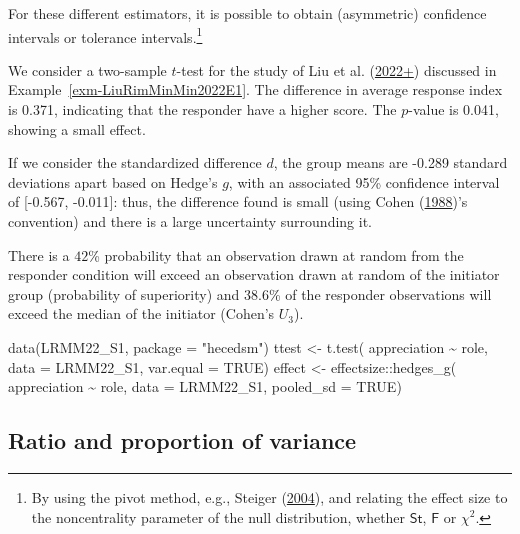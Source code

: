 \documentclass[
  11pt,
  letterpaper,
]{scrbook}
\newenvironment{Shaded}{\begin{snugshade}}{\end{snugshade}}
\newcommand{\AttributeTok}[1]{\textcolor[rgb]{0.40,0.45,0.13}{#1}}
\newcommand{\ConstantTok}[1]{\textcolor[rgb]{0.56,0.35,0.01}{#1}}
\newcommand{\FunctionTok}[1]{\textcolor[rgb]{0.28,0.35,0.67}{#1}}
\newcommand{\NormalTok}[1]{\textcolor[rgb]{0.00,0.23,0.31}{#1}}
\newcommand{\OtherTok}[1]{\textcolor[rgb]{0.00,0.23,0.31}{#1}}
\newcommand{\SpecialCharTok}[1]{\textcolor[rgb]{0.37,0.37,0.37}{#1}}
\newcommand{\StringTok}[1]{\textcolor[rgb]{0.13,0.47,0.30}{#1}}
\theoremstyle{definition}
\theoremstyle{remark}
\begin{document}
For these different estimators, it is possible to obtain (asymmetric)
confidence intervals or tolerance intervals.\footnote{By using the pivot
  method, e.g., Steiger (\protect\hyperlink{ref-Steiger:2004}{2004}),
  and relating the effect size to the noncentrality parameter of the
  null distribution, whether \(\mathsf{St}\), \(\mathsf{F}\) or
  \(\chi^2\).}

\leavevmode{}%
We consider a two-sample \(t\)-test for the study of Liu et al.
(\protect\hyperlink{ref-Liu.Rim.Min.Min:2022}{2022+}) discussed in
Example~\ref{exm-LiuRimMinMin2022E1}. The difference in average response
index is 0.371, indicating that the responder have a higher score. The
\(p\)-value is 0.041, showing a small effect.

If we consider the standardized difference \(d\), the group means are
-0.289 standard deviations apart based on Hedge's \(g\), with an
associated 95\% confidence interval of {[}-0.567, -0.011{]}: thus, the
difference found is small (using Cohen
(\protect\hyperlink{ref-Cohen:1988}{1988})'s convention) and there is a
large uncertainty surrounding it.

There is a \(42\)\% probability that an observation drawn at random from
the responder condition will exceed an observation drawn at random of
the initiator group (probability of superiority) and \(38.6\)\% of the
responder observations will exceed the median of the initiator (Cohen's
\(U_3\)).

\begin{Shaded}
\begin{Highlighting}[]
\FunctionTok{data}\NormalTok{(LRMM22\_S1, }\AttributeTok{package =} \StringTok{"hecedsm"}\NormalTok{)}
\NormalTok{ttest }\OtherTok{\textless{}{-}} \FunctionTok{t.test}\NormalTok{(}
\NormalTok{  appreciation }\SpecialCharTok{\textasciitilde{}}\NormalTok{ role, }
  \AttributeTok{data =}\NormalTok{ LRMM22\_S1,}
  \AttributeTok{var.equal =} \ConstantTok{TRUE}\NormalTok{)}
\NormalTok{effect }\OtherTok{\textless{}{-}}\NormalTok{ effectsize}\SpecialCharTok{::}\FunctionTok{hedges\_g}\NormalTok{(}
\NormalTok{  appreciation }\SpecialCharTok{\textasciitilde{}}\NormalTok{ role, }
  \AttributeTok{data =}\NormalTok{ LRMM22\_S1, }
  \AttributeTok{pooled\_sd =} \ConstantTok{TRUE}\NormalTok{)}
\end{Highlighting}
\end{Shaded}

\hypertarget{ratio-and-proportion-of-variance}{%
\subsection{Ratio and proportion of
variance}\label{ratio-and-proportion-of-variance}}
\end{document}
